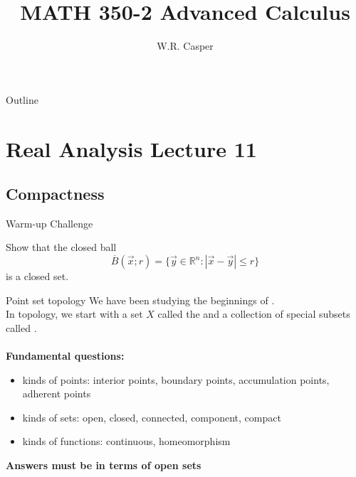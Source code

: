 \documentclass{beamer}
\title{MATH 350-2 Advanced Calculus}
\subtitle
{} %
\author[W.R. Casper] %
{W.R. Casper}
\institute[California State University Fullerton] %
{
  Department of Mathematics\\
  California State University Fullerton}
\begin{document}
\begin{frame}
  \titlepage
\end{frame}

\begin{frame}{Outline}
  \tableofcontents
\end{frame}



\section{Real Analysis Lecture 11}
\subsection{Compactness}

\begin{frame}{Warm-up Challenge}
\begin{prob}
Show that the closed ball
$$\overline B(\vec x; r) = \{\vec y\in \mathbb{R}^n: |\vec x-\vec y| \leq r\}$$
is a closed set.
\end{prob}
\end{frame}

\begin{frame}{Point set topology}
We have been studying the beginnings of .\\
In topology, we start with a set $X$ called the  and a collection of special subsets called .\\\mbox{}\\
\textbf{Fundamental questions:}
\begin{itemize}
\item kinds of points: interior points, boundary points, accumulation points, adherent points
\item kinds of sets: open, closed, connected, component, compact
\item kinds of functions: continuous, homeomorphism
\end{itemize}
{\color{red}\textbf{Answers must be in terms of open sets}}
\end{frame}
\end{document}

